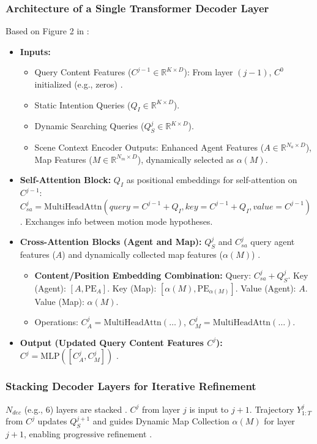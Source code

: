 \subsubsection{Architecture of a Single Transformer Decoder Layer}
Based on Figure 2 in \cite{Shi2022MTR}:
\begin{itemize}
    \item \textbf{Inputs:}
    \begin{itemize}
        \item Query Content Features ($C^{j-1} \in \mathbb{R}^{K \times D}$): From layer $(j-1)$, $C^0$ initialized (e.g., zeros) \cite{Shi2022MTR}.
        \item Static Intention Queries ($Q_I \in \mathbb{R}^{K \times D}$).
        \item Dynamic Searching Queries ($Q_S^j \in \mathbb{R}^{K \times D}$).
        \item Scene Context Encoder Outputs: Enhanced Agent Features ($A \in \mathbb{R}^{N_a \times D}$), Map Features ($M \in \mathbb{R}^{N_m \times D}$), dynamically selected as $\alpha(M)$.
    \end{itemize}
    \item \textbf{Self-Attention Block:} $Q_I$ as positional embeddings for self-attention on $C^{j-1}$: $C_{sa}^j = \text{MultiHeadAttn}(query=C^{j-1}+Q_I, key=C^{j-1}+Q_I, value=C^{j-1})$ \cite{Shi2022MTR}. Exchanges info between motion mode hypotheses.
    \item \textbf{Cross-Attention Blocks (Agent and Map):} $Q_S^j$ and $C_{sa}^j$ query agent features ($A$) and dynamically collected map features ($\alpha(M)$) \cite{Shi2022MTR}.
    \begin{itemize}
        \item \textbf{Content/Position Embedding Combination:} Query: $C_{sa}^j + Q_S^j$. Key (Agent): $[A, \text{PE}_A]$. Key (Map): $[\alpha(M), \text{PE}_{\alpha(M)}]$. Value (Agent): $A$. Value (Map): $\alpha(M)$.
        \item Operations: $C_A^j = \text{MultiHeadAttn}(\dots)$, $C_M^j = \text{MultiHeadAttn}(\dots)$.
    \end{itemize}
    \item \textbf{Output (Updated Query Content Features $C^j$):} $C^j = \text{MLP}([C_A^j, C_M^j])$ \cite{Shi2022MTR}.
\end{itemize}

\subsubsection{Stacking Decoder Layers for Iterative Refinement}
$N_{dec}$ (e.g., 6) layers are stacked \cite{Shi2022MTR_A}. $C^j$ from layer $j$ is input to $j+1$. Trajectory $Y_{1:T}^j$ from $C^j$ updates $Q_S^{j+1}$ and guides Dynamic Map Collection $\alpha(M)$ for layer $j+1$, enabling progressive refinement \cite{Shi2022MTR, Vaswani2017Attention}.

